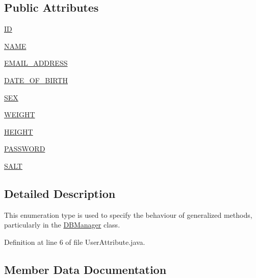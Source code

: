\subsection*{Public Attributes}
\begin{DoxyCompactItemize}
\item 
\mbox{\hyperlink{enumcom_1_1activitytracker_1_1_user_attribute_a82c5680d15b629e939afcd98a39abf76}{ID}}
\item 
\mbox{\hyperlink{enumcom_1_1activitytracker_1_1_user_attribute_aac51a5dfcaaa9e5304d37d74fc888af4}{N\+A\+ME}}
\item 
\mbox{\hyperlink{enumcom_1_1activitytracker_1_1_user_attribute_a8b9fa2ebf911262dfa24c683ff2a3b9c}{E\+M\+A\+I\+L\+\_\+\+A\+D\+D\+R\+E\+SS}}
\item 
\mbox{\hyperlink{enumcom_1_1activitytracker_1_1_user_attribute_af3b77ceae76c5f1c46e6821dc98940ee}{D\+A\+T\+E\+\_\+\+O\+F\+\_\+\+B\+I\+R\+TH}}
\item 
\mbox{\hyperlink{enumcom_1_1activitytracker_1_1_user_attribute_a53fe928fb805b69c606a351aac257558}{S\+EX}}
\item 
\mbox{\hyperlink{enumcom_1_1activitytracker_1_1_user_attribute_a024206b0dc3261031ef586b3f0fd530c}{W\+E\+I\+G\+HT}}
\item 
\mbox{\hyperlink{enumcom_1_1activitytracker_1_1_user_attribute_a0a80ca5cce8eb4494c2128bd4291a5b7}{H\+E\+I\+G\+HT}}
\item 
\mbox{\hyperlink{enumcom_1_1activitytracker_1_1_user_attribute_aa893eac0362a28e73a599ce1ba141d40}{P\+A\+S\+S\+W\+O\+RD}}
\item 
\mbox{\hyperlink{enumcom_1_1activitytracker_1_1_user_attribute_acd286be9d131a84a2be02e1cdac4c848}{S\+A\+LT}}
\end{DoxyCompactItemize}


\subsection{Detailed Description}
This enumeration type is used to specify the behaviour of generalized methods, particularly in the \mbox{\hyperlink{classcom_1_1activitytracker_1_1_d_b_manager}{D\+B\+Manager}} class. 

Definition at line 6 of file User\+Attribute.\+java.



\subsection{Member Data Documentation}
\mbox{\label{enumcom_1_1activitytracker_1_1_user_attribute_af3b77ceae76c5f1c46e6821dc98940ee}} 
